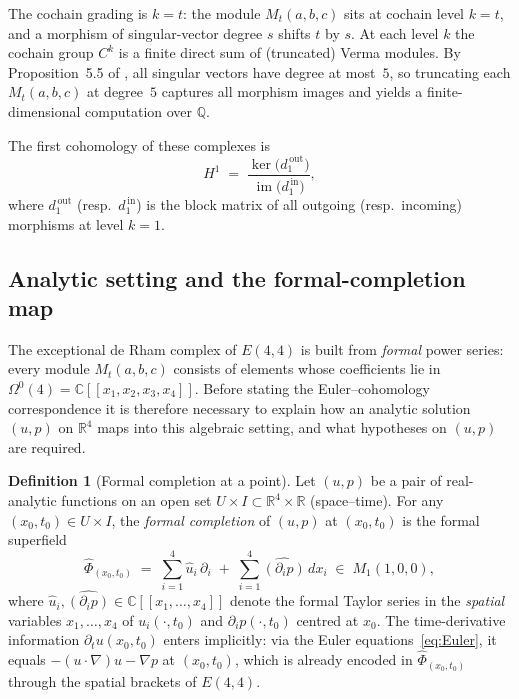 \documentclass[reqno,10pt]{amsart}
\theoremstyle{definition}
\newtheorem{defin}[subsubsection]{Definition}
\begin{document}
The cochain grading is $k = t$: the module $M_t(a,b,c)$ sits at cochain level $k=t$,
and a morphism of singular-vector degree $s$ shifts $t$ by $s$.  At each level
$k$ the cochain group $C^k$ is a finite direct sum of (truncated) Verma modules.
By Proposition~5.5 of \cite{CCK2026}, all singular vectors have degree at most~$5$,
so truncating each $M_t(a,b,c)$ at degree~$5$ captures all morphism images and
yields a finite-dimensional computation over $\mathbb{Q}$.

The first cohomology of these complexes is
\[
  H^1 \;=\; \frac{\ker\bigl(d^{\,\text{out}}_1\bigr)}{\operatorname{im}\bigl(d^{\,\text{in}}_1\bigr)},
\]
where $d^{\,\text{out}}_1$ (resp.\ $d^{\,\text{in}}_1$) is the block matrix of all outgoing
(resp.\ incoming) morphisms at level $k=1$.

\subsection{Analytic setting and the formal-completion map}
\label{subsec:analytic}

The exceptional de Rham complex of $E(4,4)$ is built from \emph{formal}
power series: every module $M_t(a,b,c)$ consists of elements whose
coefficients lie in $\Omega^0(4) = \mathbb{C}[[x_1,x_2,x_3,x_4]]$.
Before stating the Euler--cohomology correspondence it is therefore necessary
to explain how an analytic solution $(u,p)$ on $\mathbb{R}^4$ maps into
this algebraic setting, and what hypotheses on $(u,p)$ are required.

\begin{defin}[Formal completion at a point]\label{def:formal-completion}
Let $(u,p)$ be a pair of real-analytic functions on an open set
$U\times I\subset\mathbb{R}^4\times\mathbb{R}$ (space--time).  For any
$(x_0,t_0)\in U\times I$, the \emph{formal completion} of $(u,p)$ at
$(x_0,t_0)$ is the formal superfield
\[
  \widehat{\Phi}_{(x_0,t_0)}
  \;=\;
  \sum_{i=1}^4 \hat{u}_i\,\partial_i
  \;+\;
  \sum_{i=1}^4 \widehat{(\partial_i p)}\,dx_i
  \;\in\; M_1(1,0,0),
\]
where $\hat{u}_i, \widehat{(\partial_i p)}\in\mathbb{C}[[x_1,\ldots,x_4]]$
denote the formal Taylor series in the \emph{spatial} variables $x_1,\ldots,x_4$
of $u_i(\cdot,t_0)$ and $\partial_i p(\cdot,t_0)$ centred at $x_0$.  The
time-derivative information $\partial_t u(x_0,t_0)$ enters implicitly: via
the Euler equations~\eqref{eq:Euler}, it equals $-(u\cdot\nabla)u - \nabla p$
at $(x_0,t_0)$, which is already encoded in $\widehat{\Phi}_{(x_0,t_0)}$
through the spatial brackets of $E(4,4)$.
\end{defin}
\end{document}
